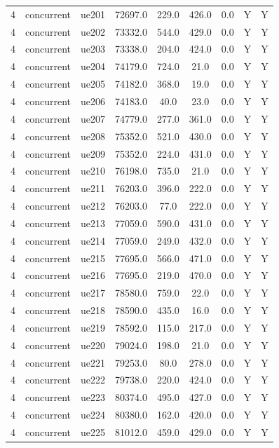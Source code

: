 \begin{table}[ht]
\begin{tabular}{|c|c|c|c|c|c|c|c|c|}
4 & concurrent & ue201 & 72697.0 & 229.0 & 426.0 & 0.0 & Y & Y \\
4 & concurrent & ue202 & 73332.0 & 544.0 & 429.0 & 0.0 & Y & Y \\
4 & concurrent & ue203 & 73338.0 & 204.0 & 424.0 & 0.0 & Y & Y \\
4 & concurrent & ue204 & 74179.0 & 724.0 & 21.0 & 0.0 & Y & Y \\
4 & concurrent & ue205 & 74182.0 & 368.0 & 19.0 & 0.0 & Y & Y \\
4 & concurrent & ue206 & 74183.0 & 40.0 & 23.0 & 0.0 & Y & Y \\
4 & concurrent & ue207 & 74779.0 & 277.0 & 361.0 & 0.0 & Y & Y \\
4 & concurrent & ue208 & 75352.0 & 521.0 & 430.0 & 0.0 & Y & Y \\
4 & concurrent & ue209 & 75352.0 & 224.0 & 431.0 & 0.0 & Y & Y \\
4 & concurrent & ue210 & 76198.0 & 735.0 & 21.0 & 0.0 & Y & Y \\
4 & concurrent & ue211 & 76203.0 & 396.0 & 222.0 & 0.0 & Y & Y \\
4 & concurrent & ue212 & 76203.0 & 77.0 & 222.0 & 0.0 & Y & Y \\
4 & concurrent & ue213 & 77059.0 & 590.0 & 431.0 & 0.0 & Y & Y \\
4 & concurrent & ue214 & 77059.0 & 249.0 & 432.0 & 0.0 & Y & Y \\
4 & concurrent & ue215 & 77695.0 & 566.0 & 471.0 & 0.0 & Y & Y \\
4 & concurrent & ue216 & 77695.0 & 219.0 & 470.0 & 0.0 & Y & Y \\
4 & concurrent & ue217 & 78580.0 & 759.0 & 22.0 & 0.0 & Y & Y \\
4 & concurrent & ue218 & 78590.0 & 435.0 & 16.0 & 0.0 & Y & Y \\
4 & concurrent & ue219 & 78592.0 & 115.0 & 217.0 & 0.0 & Y & Y \\
4 & concurrent & ue220 & 79024.0 & 198.0 & 21.0 & 0.0 & Y & Y \\
4 & concurrent & ue221 & 79253.0 & 80.0 & 278.0 & 0.0 & Y & Y \\
4 & concurrent & ue222 & 79738.0 & 220.0 & 424.0 & 0.0 & Y & Y \\
4 & concurrent & ue223 & 80374.0 & 495.0 & 427.0 & 0.0 & Y & Y \\
4 & concurrent & ue224 & 80380.0 & 162.0 & 420.0 & 0.0 & Y & Y \\
4 & concurrent & ue225 & 81012.0 & 459.0 & 429.0 & 0.0 & Y & Y \\

\end{tabular}
\end{table}
